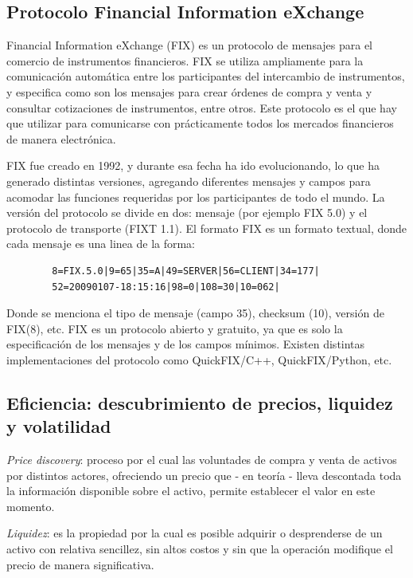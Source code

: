 \subsection{Protocolo Financial Information eXchange}
Financial Information eXchange (FIX) es un protocolo de mensajes para el
comercio de instrumentos financieros. FIX se utiliza ampliamente para la
comunicación automática entre los participantes del intercambio de
instrumentos, y especifica como son los mensajes para crear órdenes de compra y
venta y consultar cotizaciones de instrumentos, entre otros. Este protocolo es
el que hay que utilizar para comunicarse con prácticamente todos los mercados
financieros de manera electrónica.

FIX fue creado en 1992, y durante esa fecha ha ido evolucionando, lo que ha
generado distintas versiones, agregando diferentes mensajes y campos para
acomodar las funciones requeridas por los participantes de todo el mundo. La
versión del protocolo se divide en dos: mensaje (por ejemplo FIX 5.0) y el
protocolo de transporte (FIXT 1.1).
El formato FIX es un formato textual, donde cada mensaje es una linea de la
forma:
\vspace{0.5cm}
\begin{verbatim}
        8=FIX.5.0|9=65|35=A|49=SERVER|56=CLIENT|34=177|
        52=20090107-18:15:16|98=0|108=30|10=062|
\end{verbatim}
\vspace{0.5cm}

\noindent Donde se menciona el tipo de mensaje (campo 35), checksum (10), versión de
FIX(8), etc. FIX es un protocolo abierto y gratuito, ya que es solo la
especificación de los mensajes y de los campos mínimos. Existen distintas
implementaciones del protocolo como QuickFIX/C++, QuickFIX/Python, etc.

\subsection{Eficiencia: descubrimiento de precios, liquidez y volatilidad}

\emph{Price discovery}: proceso por el cual las voluntades de compra y venta de
activos por distintos actores, ofreciendo un precio que - en teoría - lleva
descontada toda la información disponible sobre el activo, permite establecer
el valor en este momento.

\emph{Liquidez}: es la propiedad por la cual es posible adquirir o desprenderse
de un activo con relativa sencillez, sin altos costos y sin que la operación
modifique el precio de manera significativa.

